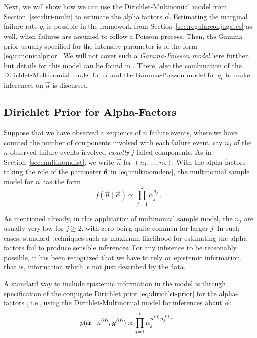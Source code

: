 Next, we will show how we can use the Dirichlet-Multinomial model
from Section~\ref{sec:diri-multi} to estimate the alpha factors $\vec{\alpha}$.
Estimating the marginal failure rate $q_t$ is possible in the framework from Section~\ref{sec:regularconjugates} as well,
when failures are assumed to follow a Poisson process.
Then, the Gamma prior usually specified for the intensity parameter is of the form \eqref{eq:canonicalprior}.
We will not cover such a \emph{Gamma-Poisson model} here further,
but details for this model can be found in \textcite{Troffaes2013a}.
There, also the combination of the Dirichlet-Multinomial model for $\vec{\alpha}$
and the Gamma-Poisson model for $q_t$ to make inferences on $\vec{q}$ is discussed.


\subsection{Dirichlet Prior for Alpha-Factors}
\label{sec:alpha-factor-prior}

Suppose that we have observed a sequence of $n$ failure events,
where we have counted the number of components involved with each failure event,
say $n_j$ of the $n$ observed failure events involved \emph{exactly} $j$ failed components.
As in Section~\ref{sec:multinomdist}, we write $\vec{n}$ for $(n_1,\dots,n_k)$.
With the alpha-factors taking the role of the parameter $\boldsymbol{\theta}$ in \eqref{eq:multinomdens},
the multinomial sample model for $\vec{n}$ has the form
\begin{equation*}
f(\vec{n}\mid\vec{\alpha}) \propto \prod_{j=1}^k\alpha_j^{n_j}\,.
\end{equation*}

As mentioned already, in this application of multinomial sample model,
the $n_j$ are usually very low for $j\ge 2$,
with zero being quite common for larger $j$.
In such cases, standard techniques such as maximum likelihood for estimating the alpha-factors fail to produce sensible inferences.
For any inference to be reasonably possible, it has been recognized \parencite{1988:mosleh::common:cause}
that we have to rely on epistemic information, that is, information which is not just described by the data.

A standard way to include epistemic information in the model is
through specification of the conjugate Dirichlet prior \eqref{eq:dirichlet-prior} for the alpha-factors \parencite{1988:mosleh::common:cause},
i.e., using the Dirichlet-Multinomial model for inferences about $\vec{\alpha}$:
\begin{equation*}
p({\bm\alpha}\mid n^{(0)},{\bm y}^{(0)}) \propto \prod_{j=1}^k\alpha_j^{n^{(0)}y^{(0)}_j-1}
\end{equation*}

